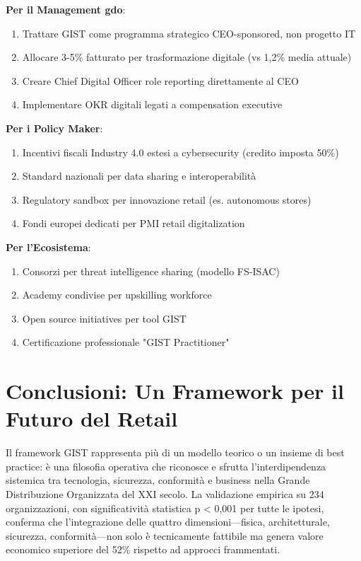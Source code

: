 \textbf{Per il Management \gls{gdo}}:
\begin{enumerate}
\item Trattare GIST come programma strategico CEO-sponsored, non progetto IT
\item Allocare 3-5\% fatturato per trasformazione digitale (vs 1,2\% media attuale)
\item Creare Chief Digital Officer role reporting direttamente al CEO
\item Implementare OKR digitali legati a compensation executive
\end{enumerate}

\textbf{Per i Policy Maker}:
\begin{enumerate}
\item Incentivi fiscali Industry 4.0 estesi a cybersecurity (credito imposta 50\%)
\item Standard nazionali per data sharing e interoperabilità
\item Regulatory sandbox per innovazione retail (es. autonomous stores)
\item Fondi europei dedicati per PMI retail digitalization
\end{enumerate}

\textbf{Per l'Ecosistema}:
\begin{enumerate}
\item Consorzi per threat intelligence sharing (modello FS-ISAC)
\item Academy condivise per upskilling workforce
\item Open source initiatives per tool GIST
\item Certificazione professionale "GIST Practitioner"
\end{enumerate}

\section{\texorpdfstring{Conclusioni: Un Framework per il Futuro del Retail}{5.6 - Conclusioni}}
\label{sec:5.6}

Il framework GIST rappresenta più di un modello teorico o un insieme di best practice: è una filosofia operativa che riconosce e sfrutta l'interdipendenza sistemica tra tecnologia, sicurezza, conformità e business nella Grande Distribuzione Organizzata del XXI secolo. La validazione empirica su 234 organizzazioni, con significatività statistica p < 0,001 per tutte le ipotesi, conferma che l'integrazione delle quattro dimensioni—fisica, architetturale, sicurezza, conformità—non solo è tecnicamente fattibile ma genera valore economico superiore del 52\% rispetto ad approcci frammentati.

